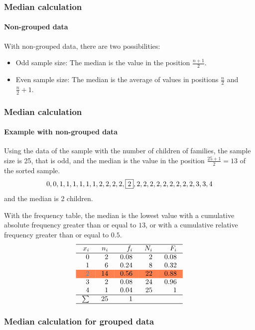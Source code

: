 \begin{frame}
\frametitle{Median calculation}
\framesubtitle{Non-grouped data}
With non-grouped data, there are two possibilities:
\begin{itemize}
\item Odd sample size: The median is the value in the position $\frac{n+1}{2}$.
\item Even sample size: The median is the average of values in positions $\frac{n}{2}$ and $\frac{n}{2}+1$.
\end{itemize}
\begin{center}
\scalebox{0.4}{}
\end{center}
\end{frame}


\begin{frame}
\frametitle{Median calculation}
\framesubtitle{Example with non-grouped data}
Using the data of the sample with the number of children of families, the sample size is 25, that is odd, and the median
is the value in the position $\frac{25+1}{2} = 13$ of the sorted sample. 
\[
0,0,1,1,1,1,1,1,2,2,2,2,\fbox{2},2,2,2,2,2,2,2,2,2,3,3,4
\]
and the median is 2 children.

With the frequency table, the median is the lowest value with a cumulative absolute frequency greater than or equal to
$13$, or with a cumulative relative frequency greater than or equal to $0.5$.
\[
\setlength\arraycolsep{3mm}
\setlength\arrayrulewidth{0.5pt}
\begin{array}{rrrrr}
\hline
x_i & n_i & f_i & N_i & F_i\\
\hline
0 & 2 & 0.08 & 2 & 0.08\\
1 & 6 & 0.24 & 8 & 0.32\\
\rowcolor{coral} \color{color1}2 & 14 & 0.56 & 22 & 0.88\\
3 & 2  & 0.08 & 24 & 0.96\\
4 & 1 & 0.04 & 25 & 1 \\
\hline
\sum & 25 & 1 \\
\hline
\end{array}
\]
\end{frame}


\begin{frame}
\frametitle{Median calculation for grouped data}

\centering
{}

 
\end{frame}


